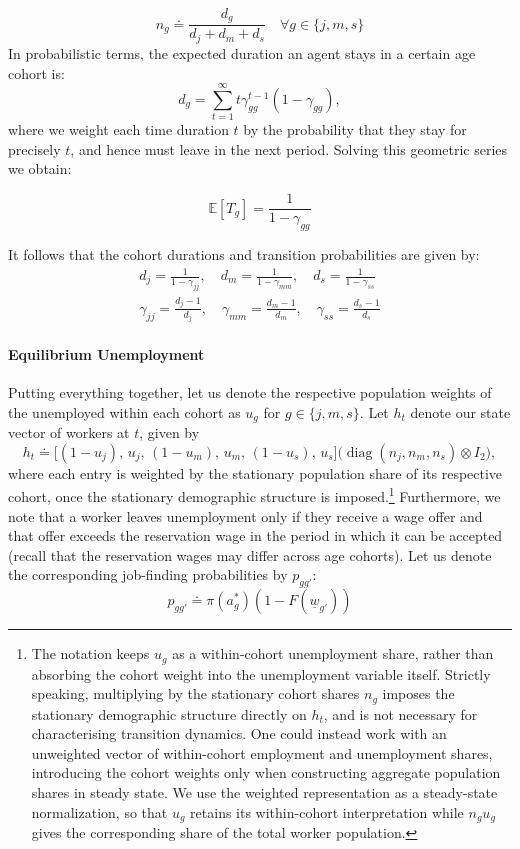 \documentclass{article}
\newcommand{\lbar}[1]{\underline{#1}} %
\begin{document}
\[
n_g\doteq\frac{d_g}{d_j+d_m+d_s}\quad\forall g\in\{j,m,s\}
\]
In probabilistic terms, the expected duration an agent stays in a certain age cohort is:
\[
d_g=\sum^\infty_{t=1}t\gamma_{gg}^{t-1}(1-\gamma_{gg}),
\]
where we weight each time duration $t$ by the probability that they stay for precisely $t$, and hence must leave in the next period. Solving this geometric series we obtain:

\[
\mathbb{E}[T_g]=\frac{1}{1-\gamma_{gg}}
\]

It follows that the cohort durations and transition probabilities are given by:
\begin{align*}
d_j=\frac{1}{1-\gamma_{jj}},\quad 
d_m=\frac{1}{1-\gamma_{mm}},\quad 
d_s=\frac{1}{1-\gamma_{ss}}\\
\gamma_{jj}=\frac{d_j-1}{d_j},\quad
\gamma_{mm}=\frac{d_m-1}{d_m},\quad
\gamma_{ss}=\frac{d_s-1}{d_s}
\end{align*}

\paragraph{Equilibrium Unemployment}
Putting everything together, let us denote the respective population weights of the unemployed within each cohort as $u_g$ for $g\in\{j,m,s\}$. Let $h_t$ denote our state vector of workers at $t$, given by
\[
h_t \doteq
\bigl[(1-u_j),\, u_j,\, (1-u_m),\, u_m,\, (1-u_s),\, u_s\bigr]
\bigl(\operatorname{diag}(n_j,n_m,n_s)\otimes I_2\bigr),
\]
where each entry is weighted by the stationary population share of its respective cohort, once the stationary demographic structure is imposed.\footnote{The notation keeps $u_g$ as a within-cohort unemployment share, rather than absorbing the cohort weight into the unemployment variable itself. Strictly speaking, multiplying by the stationary cohort shares $n_g$ imposes the stationary demographic structure directly on $h_t$, and is not necessary for characterising transition dynamics. One could instead work with an unweighted vector of within-cohort employment and unemployment shares, introducing the cohort weights only when constructing aggregate population shares in steady state. We use the weighted representation as a steady-state normalization, so that $u_g$ retains its within-cohort interpretation while $n_g u_g$ gives the corresponding share of the total worker population.} Furthermore, we note that a worker leaves unemployment only if they receive a wage offer and that offer exceeds the reservation wage in the period in which it can be accepted (recall that the reservation wages may differ across age cohorts). Let us denote the corresponding job-finding probabilities by $p_{gg'}$:
\[
p_{gg'}\doteq\pi(a^*_g)(1-F(\lbar{w}_{g'}))
\]
\end{document}
